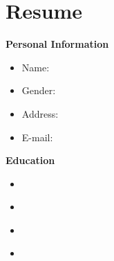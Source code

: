 

\chapter*{Resume}

\noindent
{\bf Personal Information}
\begin{itemize}\wuhao
  \item [] Name: 
  \item [] Gender: 
  \item [] Address: 
  \item [] E-mail:
\end{itemize}

\noindent
{\bf Education}
\begin{itemize}\wuhao
\item [] 
\item [] \ \ \ \ \ \ \ \ \ \ \ \ \ \ \ \ \ \ \ \ \ \ \ \ \ \ \ \ \ \ \ 
\item [] 
\item [] \ \ \ \ \ \ \ \ \ \ \ \ \ \ \ \ \ \ \ \ \ \ \ \ \ \ \ \ \ \ \ \end{itemize}
